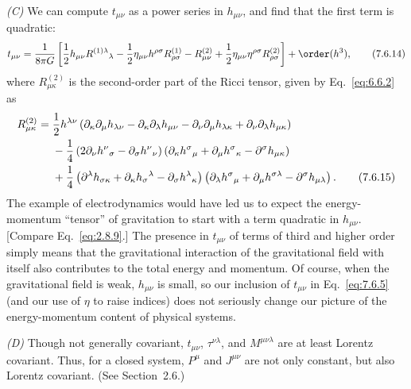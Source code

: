 \medskip
\noindent\textit{(C)} We can compute \(t_{\mu\nu}\) as a power series in
\(h_{\mu\nu}\), and find that the first term is quadratic:
\begin{equation}
  t_{\mu\nu}
  =
  \frac{1}{8\pi G}\left[
    \frac12h_{\mu\nu}R^{(1)\lambda}{}_\lambda
    -\frac12\eta_{\mu\nu}h^{\rho\sigma}R^{(1)}_{\rho\sigma}
    -R^{(2)}_{\mu\nu}
    +\frac12\eta_{\mu\nu}\eta^{\rho\sigma}R^{(2)}_{\rho\sigma}
  \right]
  +\order(h^3),
  \tag{7.6.14}\label{eq:7.6.14}
\end{equation}
where \(R^{(2)}_{\mu\kappa}\) is the second-order part of the Ricci tensor,
given by Eq.~\eqref{eq:6.6.2} as
\begin{align}
  R^{(2)}_{\mu\kappa}
  ={}&
  \frac12h^{\lambda\nu}\left(
    \partial_\kappa\partial_\mu h_{\lambda\nu}
    -\partial_\kappa\partial_\lambda h_{\mu\nu}
    -\partial_\nu\partial_\mu h_{\lambda\kappa}
    +\partial_\nu\partial_\lambda h_{\mu\kappa}
  \right)
  \notag\\
  &-\frac14\left(
    2\partial_\nu h^\nu{}_\sigma
    -\partial_\sigma h^\nu{}_\nu
  \right)
  \left(
    \partial_\kappa h^\sigma{}_\mu
    +\partial_\mu h^\sigma{}_\kappa
    -\partial^\sigma h_{\mu\kappa}
  \right)
  \notag\\
  &+\frac14\left(
    \partial^\lambda h_{\sigma\kappa}
    +\partial_\kappa h_\sigma{}^\lambda
    -\partial_\sigma h^\lambda{}_\kappa
  \right)
  \left(
    \partial_\lambda h^\sigma{}_\mu
    +\partial_\mu h^{\sigma\lambda}
    -\partial^\sigma h_{\mu\lambda}
  \right).
  \tag{7.6.15}\label{eq:7.6.15}
\end{align}
The example of electrodynamics would have led us to expect the
energy-momentum ``tensor'' of gravitation to start with a term quadratic in
\(h_{\mu\nu}\). [Compare Eq.~\eqref{eq:2.8.9}.] The presence in
\(t_{\mu\nu}\) of terms of third and higher order simply means that the
gravitational interaction of the gravitational field with itself also
contributes to the total energy and momentum. Of course, when the
gravitational field is weak, \(h_{\mu\nu}\) is small, so our inclusion of
\(t_{\mu\nu}\) in Eq.~\eqref{eq:7.6.5} (and our use of \(\eta\) to raise
indices) does not seriously change our picture of the energy-momentum
content of physical systems.

\medskip
\noindent\textit{(D)} Though not generally covariant, \(t_{\mu\nu}\),
\(\tau^{\nu\lambda}\), and \(M^{\mu\nu\lambda}\) are at least Lorentz
covariant. Thus, for a closed system, \(P^\mu\) and \(J^{\mu\nu}\) are not
only constant, but also Lorentz covariant. (See Section~2.6.)

